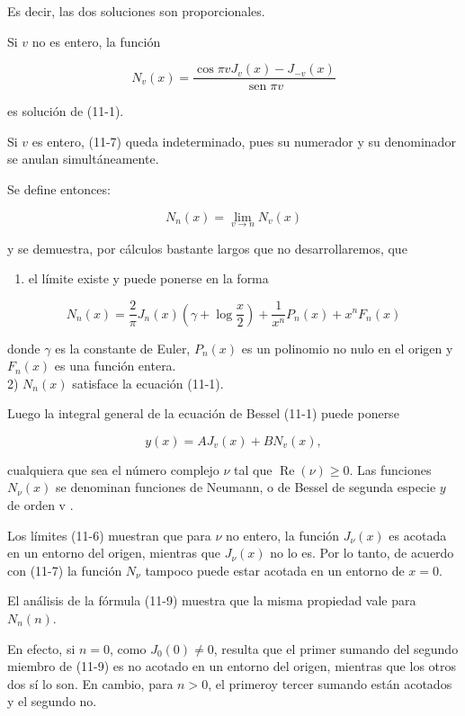 \documentclass[10pt]{article}
\theoremstyle{plain}
\theoremstyle{definition}
\theoremstyle{remark}
\begin{document}
Es decir, las dos soluciones son proporcionales.

Si $v$ no es entero, la función


\begin{equation*}
N_{v}(x)=\frac{\cos \pi v J_{v}(x)-J_{-v}(x)}{\operatorname{sen} \pi v} \tag{11-7}
\end{equation*}


es solución de (11-1).

Si $v$ es entero, (11-7) queda indeterminado, pues su numerador y su denominador se anulan simultáneamente.

Se define entonces:

$$
N_{n}(x)=\lim _{v \rightarrow n} N_{v}(x)
$$

y se demuestra, por cálculos bastante largos que no desarrollaremos, que

\begin{enumerate}
  \item el límite existe y puede ponerse en la forma
\end{enumerate}


\begin{equation*}
N_{n}(x)=\frac{2}{\pi} J_{n}(x)\left(\gamma+\log \frac{x}{2}\right)+\frac{1}{x^{n}} P_{n}(x)+x^{n} F_{n}(x) \tag{11-9}
\end{equation*}


donde $\gamma$ es la constante de Euler, $P_{n}(x)$ es un polinomio no nulo en el origen y $F_{n}(x)$ es una función entera.\\
2) $N_{n}(x)$ satisface la ecuación (11-1).

Luego la integral general de la ecuación de Bessel (11-1) puede ponerse

$$
y(x)=A J_{v}(x)+B N_{v}(x),
$$

cualquiera que sea el número complejo $\nu$ tal que $\operatorname{Re}(\nu) \geqslant 0$. Las funciones $N_{\nu}(x)$ se denominan funciones de Neumann, o de Bessel de segunda especie $y$ de orden v .

Los límites (11-6) muestran que para $\nu$ no entero, la función $J_{\nu}(x)$ es acotada en un entorno del origen, mientras que $J_{\nu}(x)$ no lo es. Por lo tanto, de acuerdo con (11-7) la función $N_{\nu}$ tampoco puede estar acotada en un entorno de $x=0$.

El análisis de la fórmula (11-9) muestra que la misma propiedad vale para $N_{n}(n)$.

En efecto, si $n=0$, como $J_{0}(0) \neq 0$, resulta que el primer sumando del segundo miembro de (11-9) es no acotado en un entorno del origen, mientras que los otros dos sí lo son. En cambio, para $n>0$, el primeroy tercer sumando están acotados y el segundo no.
\end{document}
